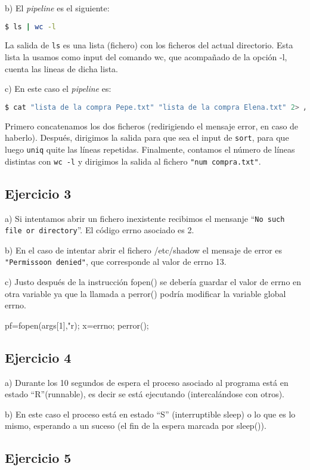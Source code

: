 \documentclass{article}
\begin{document}
b) El \textit{pipeline} es el siguiente:

\begin{lstlisting}[language=bash]
$ ls | wc -l
\end{lstlisting}

La salida de \texttt{ls} es una lista (fichero) con los ficheros del actual directorio.
Esta lista la usamos como input del comando wc, que acompañado de la opción -l, cuenta las lineas de dicha lista.


c) En este caso el \textit{pipeline} es: 

\begin{lstlisting}[language=bash]
$ cat "lista de la compra Pepe.txt" "lista de la compra Elena.txt" 2> /dev/null | sort | uniq | wc -l > "num compra.txt"
\end{lstlisting}

Primero concatenamos los dos ficheros (redirigiendo el mensaje error, en caso de haberlo). Después, dirigimos la salida para que sea el input de \texttt{sort}, para que luego \texttt{uniq} quite las líneas repetidas. Finalmente, contamos el número de líneas distintas con \texttt{wc -l} y dirigimos la salida al fichero \texttt{"num compra.txt"}.

\subsection*{Ejercicio 3}

a) Si intentamos abrir un fichero inexistente recibimos el mensanje ``\texttt{No such file or directory}''. El código errno asociado es 2.

b) En el caso de intentar abrir el fichero /etc/shadow el  mensaje de error es \texttt{"Permissoon denied"}, que corresponde al valor de errno 13.

c) Justo después de la instrucción fopen() se debería guardar el valor de errno en otra variable ya que la llamada a perror() podría modificar la variable global errno.

pf=fopen(args[1],"r); 
x=errno; 
perror();

\subsection*{Ejercicio 4}

a) Durante los 10 segundos de espera el proceso asociado al programa está en estado ``R''(runnable), es decir se está ejecutando (intercalándose con otros).

b) En este caso el proceso está en estado ``S'' (interruptible sleep) o lo que es lo mismo, esperando a un suceso (el fin de la espera marcada por sleep()). 


\subsection*{Ejercicio 5}
\end{document}
